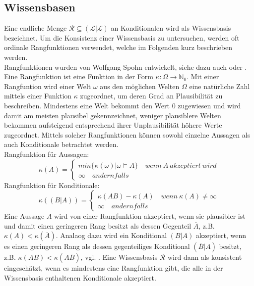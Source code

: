 \documentclass[12pt,a4paper]{article}
\newcommand{\lag}{\mathcal{L}}
\begin{document}
\subsection{Wissensbasen}
\label{sec:wissensbasen}
Eine endliche Menge $\mathcal{R} \subseteq (\lag | \lag)$ an Konditionalen wird als Wissensbasis bezeichnet. Um die Konsistenz einer Wissensbasis zu untersuchen, werden oft ordinale Rangfunktionen verwendet, welche im Folgenden kurz beschrieben werden. \\
Rangfunktionen wurden von Wolfgang Spohn entwickelt, siehe dazu auch \cite{spohn88} oder \cite{spohn12}. Eine Rangfunktion ist eine Funktion in der Form $\kappa :  \Omega \rightarrow \mathbb{N}_0 $. Mit einer Rangfuntion wird einer Welt $\omega$ aus den möglichen Welten $\Omega$ eine natürliche Zahl mittels einer Funktion $\kappa$ zugeordnet, um deren Grad an Plausibilität zu beschreiben. Mindestens eine Welt bekommt den Wert 0 zugewiesen und wird damit am meisten plausibel gekennzeichnet, weniger plausiblere Welten bekommen aufsteigend entsprechend ihrer Unplausibilität höhere Werte zugeordnet. Mittels solcher Rangfunktionen können sowohl einzelne Aussagen als auch Konditionale betrachtet werden.\\
Rangfunktion für Aussagen:
\[
 \kappa(A)=\begin{cases}
			min\{\kappa(\omega)|\omega \models A \} \quad wenn \  A \ akzeptiert \ wird \\
			\infty \quad andernfalls
            \end{cases}
\]
Rangfunktion für Konditionale:
\[
\kappa((B|A))=\begin{cases}
			\kappa(AB) - \kappa(A) \quad wenn \ \kappa(A) \neq \infty \\
			\infty \quad andernfalls
            \end{cases}
\]
Eine Aussage $A$ wird von einer Rangfunktion akzeptiert, wenn sie plausibler ist und damit einen geringeren Rang besitzt als dessen Gegenteil $\overline{A}$, z.B. $\kappa(A) < \kappa(\overline{A})$. Analaog dazu wird ein Konditional $(B|A)$ akzeptiert, wenn es einen geringeren Rang als dessen gegenteiliges Konditional $(\overline{B}|A)$ besitzt, z.B. $\kappa(AB)<\kappa(A\overline{B})$, vgl. \cite{beierle17}. Eine Wissensbasis $\mathcal{R}$ wird dann als konsistent eingeschätzt, wenn es mindestens eine Rangfunktion gibt, die alle in der Wissensbasis enthaltenen Konditionale akzeptiert.\\
\end{document}
